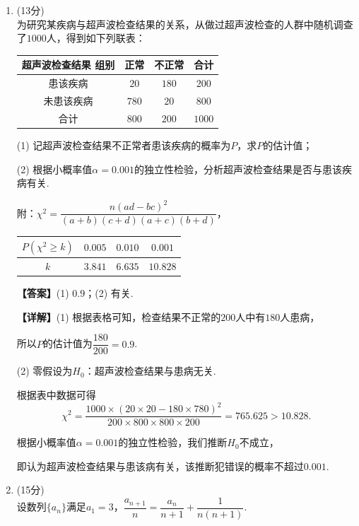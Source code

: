 \documentclass[12pt,a4paper]{article}
\begin{document}
	\begin{enumerate}[leftmargin=*,label=\arabic*.,resume,itemsep=1.2ex]
		\item (13分)\\
		为研究某疾病与超声波检查结果的关系，从做过超声波检查的人群中随机调查了$1000$人，得到如下列联表：
		\begin{center}
			\begin{tabular}{|c|c|c|c|}
				\hline
				超声波检查结果 组别 & 正常 & 不正常 & 合计 \\
				\hline
				患该疾病 & $20$ & $180$ & $200$ \\
				\hline
				未患该疾病 & $780$ & $20$ & $800$ \\
				\hline
				合计 & $800$ & $200$ & $1000$ \\
				\hline
			\end{tabular}
		\end{center}
		(1) 记超声波检查结果不正常者患该疾病的概率为$P$，求$P$的估计值；
		
		(2) 根据小概率值$\alpha=0.001$的独立性检验，分析超声波检查结果是否与患该疾病有关.
		
		附：$\chi^2=\dfrac{n(ad-bc)^2}{(a+b)(c+d)(a+c)(b+d)}$，
		\begin{center}
			\begin{tabular}{|c|c|c|c|}
				\hline
				$P(\chi^2\ge k)$ & $0.005$ & $0.010$ & $0.001$ \\
				\hline
				$k$ & $3.841$ & $6.635$ & $10.828$ \\
				\hline
			\end{tabular}
		\end{center}
		\textbf{【答案】}(1) $0.9$；(2) 有关.
		
		\textbf{【详解】}(1) 根据表格可知，检查结果不正常的$200$人中有$180$人患病，
		
		所以$P$的估计值为$\dfrac{180}{200}=0.9$.
		
		(2) 零假设为$H_0$：超声波检查结果与患病无关.
		
		根据表中数据可得
		\[
		\chi^2=\frac{1000\times(20\times20-180\times780)^2}{200\times800\times800\times200}=765.625>10.828.
		\]
		
		根据小概率值$\alpha=0.001$的独立性检验，我们推断$H_0$不成立，
		
		即认为超声波检查结果与患该病有关，该推断犯错误的概率不超过$0.001$.
		
		\item (15分)\\
		设数列$\{a_n\}$满足$a_1=3$，$\dfrac{a_{n+1}}{n}=\dfrac{a_n}{n+1}+\dfrac{1}{n(n+1)}$.
		

\end{enumerate}
\end{document}

